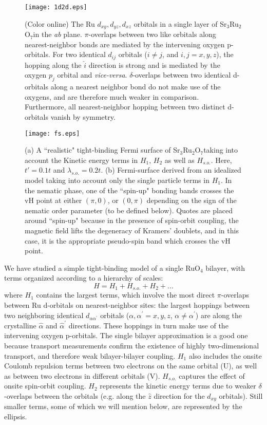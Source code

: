 \documentclass[prb,aps,amssymb,showpacs,twocolumn,amsmath,floatfix]{revtex4}
\def\be{\begin{equation}}
\def\ee{\end{equation}}
\def\SRO{Sr$_3$Ru$_2$O$_7$}
\begin{document}
\begin{figure}
\texttt{[image: 1d2d.eps]}
\caption{(Color online) The Ru $d_{xy},d_{yz},d_{xz}$ orbitals in a single layer of \SRO in the {\it ab} plane.  
$\pi$-overlaps between two like orbitals along nearest-neighbor bonds are mediated by the 
intervening oxygen p-orbitals.  For two identical $d_{ij}$ orbitals ($i \ne j$, and $ i,j=x,y,z$), the hopping 
along the $\hat{i}$ direction is strong and is mediated by the oxygen $p_j$ orbital and {\it vice-versa}.  $\delta$-overlaps between two identical d-orbitals along a nearest 
neighbor bond do not make use of the oxygens, and are therefore much weaker in comparison.  
Furthermore, all nearest-neighbor hopping between two distinct d-orbitals vanish by symmetry.}
   \label{orbitals}
\end{figure} 


\begin{figure}
\texttt{[image: fs.eps]}
\caption{ (a) A ``realistic" tight-binding Fermi surface of \SRO taking into account the Kinetic energy 
terms in $H_1$, $H_2$ as well as $H_{s.o.}$.  Here, $t'= 0.1 t$ and $\lambda_{s.o.} = 0.2 t$.  (b) Fermi-surface derived from an idealized model taking into 
account only the single particle terms in $H_1$.  In the nematic phase, one of the ``spin-up" bonding 
bands crosses the vH point at either $(\pi,0)$, or $(0, \pi)$ depending on the sign of the nematic order 
parameter (to be defined below).  Quotes are placed around ``spin-up" because in the presence of spin-orbit coupling, the magnetic field 
lifts the degeneracy of Kramers' doublets, and in this case, it is the appropriate pseudo-spin band which 
crosses the vH point.      }
   \label{fs}
\end{figure} 


We have studied a simple tight-binding model of a single RuO$_4$ bilayer, with terms 
organized according to a hierarchy of scales:
\be
\label{h}
H=H_1 +H_{s.o.} +H_2+ \ldots
\ee
where $H_1$ contains the largest terms, which involve the most direct $\pi$-overlaps between Ru d-orbitals on
 nearest-neighbor sites: the largest hoppings between two neighboring identical $d_{\alpha\alpha^\prime}$ orbitals ($\alpha, \alpha^\prime=x,y,z$, $\alpha\neq \alpha^\prime$) 
 are along the crystalline $\hat{\alpha}$ and $ \hat{\alpha}^\prime$ directions.
 These hoppings in turn make use of the intervening oxygen p-orbitals.  
 The single bilayer approximation is a good one because transport measurements confirm the existence of highly two-dimensional transport, and therefore weak bilayer-bilayer coupling.  
 $H_1$ also includes the onsite Coulomb repulsion terms between two electrons on the 
 same orbital (U), as well as between two electrons in different orbitals (V).    
  $H_{s.o.}$ captures the effect of onsite 
 spin-orbit coupling.
 $H_2$ represents the kinetic energy terms due to weaker 
 $\delta$-overlaps between the orbitals (e.g. along the $\hat{z}$ 
 direction for the $d_{xy}$ orbitals).  Still smaller terms, some of which we will mention below, are represented by the ellipsis.  
 
\end{document}
